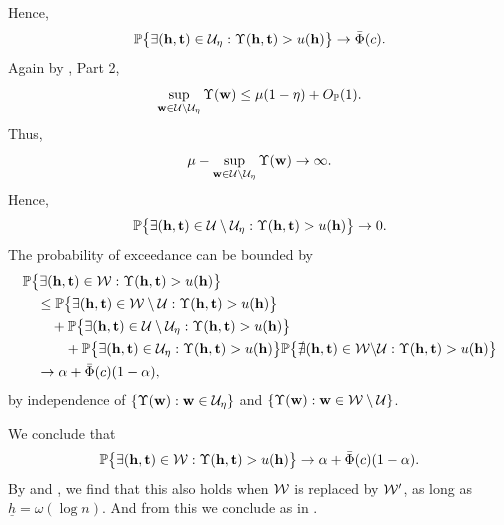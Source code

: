 \documentclass[twoside,11pt]{article}
\begin{document}
Hence,
\[
\mathbb{P} \big\{\exists (\mathbf{h},\mathbf{t}) \in \mathcal{U}_\eta : \Upsilon(\mathbf{h},\mathbf{t}) > u(\mathbf{h}) \big\} \rightarrow \bar \Phi(c).
\]
Again by , Part 2,
\[
\sup_{\mathbf{w} \in \mathcal{U} \backslash \mathcal{U}_\eta} \Upsilon(\mathbf{w}) \le \mu (1 - \eta) + O_{\mathbb{P}}(1).
\]
Thus, 
\[
\mu - \sup_{\mathbf{w} \in \mathcal{U} \backslash \mathcal{U}_\eta} \Upsilon(\mathbf{w}) \rightarrow \infty.
\]
Hence,
\[
\mathbb{P} \big\{\exists (\mathbf{h},\mathbf{t}) \in \mathcal{U} \setminus \mathcal{U}_\eta : \Upsilon(\mathbf{h},\mathbf{t}) > u(\mathbf{h}) \big\} \rightarrow 0.
\]
The probability of exceedance can be bounded by
\[
\begin{aligned}
&\mathbb{P} \big\{\exists (\mathbf{h},\mathbf{t}) \in \mathcal{W} : \Upsilon(\mathbf{h},\mathbf{t}) > u(\mathbf{h}) \big\} \\
&\quad \le \mathbb{P} \big\{ \exists (\mathbf{h},\mathbf{t}) \in \mathcal{W} \setminus \mathcal{U} : \Upsilon(\mathbf{h},\mathbf{t}) > u(\mathbf{h}) \big\} \\
&\quad\quad + \mathbb{P} \big\{\exists (\mathbf{h},\mathbf{t}) \in \mathcal{U} \setminus \mathcal{U}_\eta : \Upsilon(\mathbf{h},\mathbf{t}) > u(\mathbf{h}) \big\} \\
&\quad\quad\quad + \mathbb{P} \big\{ \exists (\mathbf{h},\mathbf{t}) \in \mathcal{U}_\eta : \Upsilon(\mathbf{h},\mathbf{t}) > u(\mathbf{h})\big\} \mathbb{P} \big\{ \nexists (\mathbf{h},\mathbf{t}) \in \mathcal{W} \backslash \mathcal{U} : \Upsilon(\mathbf{h},\mathbf{t}) > u(\mathbf{h})\big\} \\
&\quad \rightarrow \alpha + \bar \Phi(c) (1 - \alpha), 
\end{aligned}
\]
by independence of $\{\Upsilon(\mathbf{w}) : \mathbf{w} \in \mathcal{U}_\eta\}$ and $\{\Upsilon(\mathbf{w}) : \mathbf{w} \in \mathcal{W} \setminus \mathcal{U}\}$.

We conclude that
\[
\mathbb{P} \big\{\exists (\mathbf{h},\mathbf{t}) \in \mathcal{W} :  \Upsilon(\mathbf{h},\mathbf{t}) > u(\mathbf{h}) \big\} 
\rightarrow \alpha + \bar \Phi(c) (1 - \alpha). 
\]
By  and , we find that this also holds when $\mathcal{W}$ is replaced by $\mathcal{W}'$, as long as $\underline h = \omega(\log n)$.  And from this we conclude as in .
\end{document}
